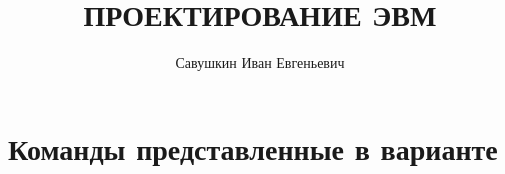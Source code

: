 \newcommand{\resdir}{res}							%

\newcommand{\docauthor}{Савушкин Иван Евгеньевич}
\newcommand{\docauthorshort}{Савушкин\,И.\,Е.}
\newcommand{\docauthormail}{savushkin@niuitmo.ru}
\newcommand{\doctitle}{ПРОЕКТИРОВАНИЕ ЭВМ}
\newcommand{\docsupervisor}{Тропченко\,А.\,А.}
\newcommand{\coursename}{Организация ЭВМ и систем}
\newcommand{\worktype}{Курсовая работа}

\title{\doctitle}
\author{\docauthor}







\chapter{Команды представленные в варианте}


